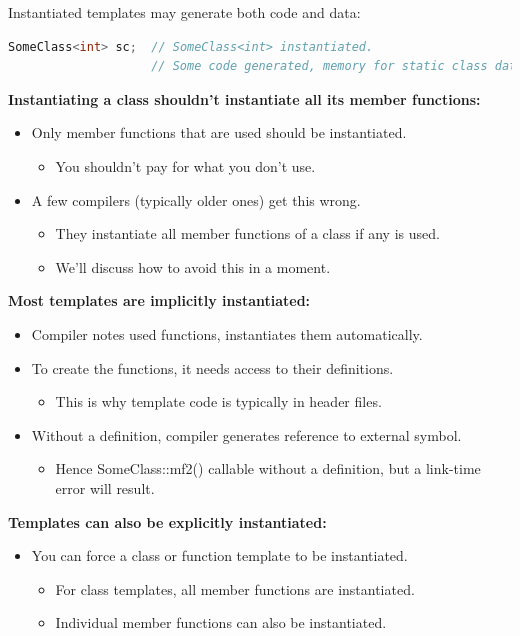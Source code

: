Instantiated templates may generate both code and data:
\begin{lstlisting}[language=C++]
SomeClass<int> sc;  // SomeClass<int> instantiated.
                    // Some code generated, memory for static class data set aside.
\end{lstlisting}
\textbf{Instantiating a class shouldn't instantiate all its member functions:}
\begin{itemize}
  \item Only member functions that are used should be instantiated.
  \begin{itemize}
    \item You shouldn't pay for what you don't use.
  \end{itemize}
  \item A few compilers (typically older ones) get this wrong.
  \begin{itemize}
    \item They instantiate all member functions of a class if any is used.
    \item We'll discuss how to avoid this in a moment.
  \end{itemize}
\end{itemize}

\textbf{Most templates are implicitly instantiated:}
\begin{itemize}
  \item Compiler notes used functions, instantiates them automatically.
  \item To create the functions, it needs access to their definitions.
  \begin{itemize}
    \item This is why template code is typically in header files.
  \end{itemize}
  \item Without a definition, compiler generates reference to external symbol.
  \begin{itemize}
    \item Hence SomeClass::mf2() callable without a definition, but a link-time error will result.
  \end{itemize}
\end{itemize}
\textbf{Templates can also be explicitly instantiated:}
\begin{itemize}
  \item You can  force a class or function template to be instantiated.
  \begin{itemize}
    \item For class templates, all member functions are instantiated.
    \item Individual member functions can also be instantiated.
  \end{itemize}
\end{itemize}

